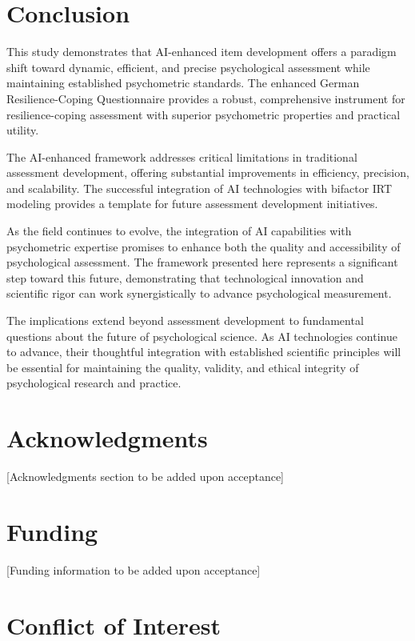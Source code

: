 \documentclass[12pt,a4paper]{article}
\begin{document}
\section{Conclusion}

This study demonstrates that AI-enhanced item development offers a paradigm shift toward dynamic, efficient, and precise psychological assessment while maintaining established psychometric standards. The enhanced German Resilience-Coping Questionnaire provides a robust, comprehensive instrument for resilience-coping assessment with superior psychometric properties and practical utility.

The AI-enhanced framework addresses critical limitations in traditional assessment development, offering substantial improvements in efficiency, precision, and scalability. The successful integration of AI technologies with bifactor IRT modeling provides a template for future assessment development initiatives.

As the field continues to evolve, the integration of AI capabilities with psychometric expertise promises to enhance both the quality and accessibility of psychological assessment. The framework presented here represents a significant step toward this future, demonstrating that technological innovation and scientific rigor can work synergistically to advance psychological measurement.

The implications extend beyond assessment development to fundamental questions about the future of psychological science. As AI technologies continue to advance, their thoughtful integration with established scientific principles will be essential for maintaining the quality, validity, and ethical integrity of psychological research and practice.

\section{Acknowledgments}

[Acknowledgments section to be added upon acceptance]

\section{Funding}

[Funding information to be added upon acceptance]

\section{Conflict of Interest}
\end{document}
